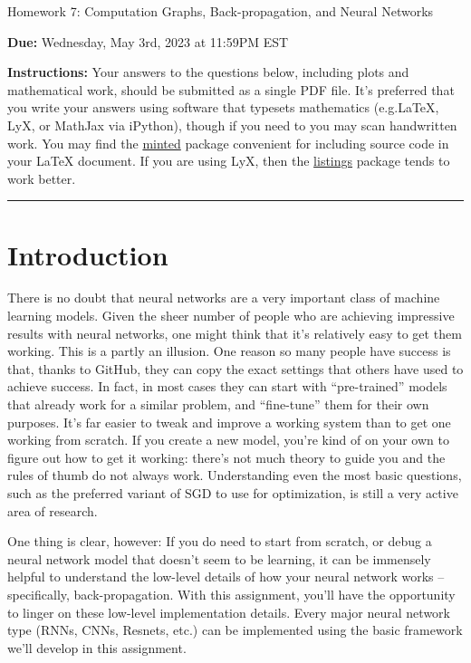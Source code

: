\documentclass{article}
\newcommand{\ruleskip}{\bigskip\hrule\bigskip}
\theoremstyle{plain}
\theoremstyle{definition}
\begin{document}

\pagestyle{myheadings} 

\begin{center}
{\Large
Homework 7: Computation Graphs, Back-propagation, and Neural Networks
} 
\end{center}

{
{ \color{nyupurple} \textbf{Due:} Wednesday, May 3rd, 2023 at 11:59PM EST} 
} 

\textbf{Instructions: }Your answers to the questions below, including plots and mathematical work, should be submitted as a single PDF file.  It's preferred that you write your answers using software that typesets mathematics (e.g.LaTeX, LyX, or MathJax via iPython), though if you need to you may scan handwritten work.  You may find the \href{https://github.com/gpoore/minted}{minted} package convenient for including source code in your LaTeX document.  If you are using LyX, then the \href{https://en.wikibooks.org/wiki/LaTeX/Source_Code_Listings}{listings} package tends to work better. 

\ruleskip

\section{Introduction}

There is no doubt that neural networks are a very important class
of machine learning models. Given the sheer number of people who are
achieving impressive results with neural networks, one might think
that it's relatively easy to get them working. This is a partly an
illusion. One reason so many people have success is that, thanks to
GitHub, they can copy the exact settings that others have used to
achieve success. In fact, in most cases they can start with ``pre-trained''
models that already work for a similar problem, and ``fine-tune''
them for their own purposes. It's far easier to tweak and improve
a working system than to get one working from scratch. If you create
a new model, you're kind of on your own to figure out how to get it
working: there's not much theory to guide you and the rules of thumb
do not always work. Understanding even the most basic questions, such
as the preferred variant of SGD to use for optimization, is still
a very active area of research.

One thing is clear, however: If you do need to start from scratch,
or debug a neural network model that doesn't seem to be learning,
it can be immensely helpful to understand the low-level details of
how your neural network works -- specifically, back-propagation.
With this assignment, you'll have the opportunity to linger on these
low-level implementation details. Every major neural network type
(RNNs, CNNs, Resnets, etc.) can be implemented using the basic framework
we'll develop in this assignment.
\end{document}
